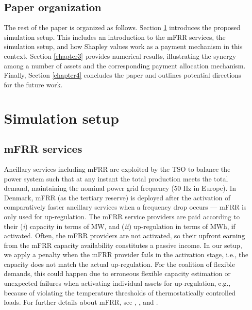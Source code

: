 \documentclass[conference]{IEEEtran}
\begin{document}
\vspace{0mm}
\subsection{Paper organization}
\vspace{-1mm}
The rest of the paper is organized as follows.
Section \ref{chapter2} introduces the proposed simulation setup. This includes an introduction to the mFRR services, the simulation setup, and how Shapley values work as a payment mechanism in this context. Section \ref{chapter3} provides numerical results, illustrating the synergy among a number of assets and the corresponding payment allocation mechanism. Finally, Section \ref{chapter4} concludes the paper and outlines  potential directions for the future work.

\section{Simulation setup}
\label{chapter2}

\subsection{mFRR services}\label{sec:mFRR}
%
Ancillary services including mFRR are exploited by the TSO to balance the power system such that at any instant the total production meets the total demand, maintaining the nominal power grid frequency (50 Hz in Europe). In Denmark, mFRR (as the tertiary reserve) is deployed after the activation of comparatively faster ancillary services when a frequency drop occurs --- mFRR is only used for up-regulation. The mFRR service providers are paid according to their (\textit{i}) capacity in terms of MW, and (\textit{ii}) up-regulation in terms of MWh, if activated. Often, the mFRR providers are not activated, so their upfront earning from the mFRR capacity availability constitutes a passive income. In our setup, we apply a penalty when the mFRR provider fails in the activation stage, i.e., the capacity does not match the actual up-regulation. For the coalition of flexible demands, this could happen  due to erroneous  flexible capacity estimation or unexpected failures when activating individual assets for up-regulation, e.g.,  because of violating the temperature thresholds of thermostatically controlled loads. %
For further details about mFRR, see  \cite{energinet:prequalification}, \cite{energinet:Systemydelser}, and \cite{energinet:tender_conditions_reserves}.
\end{document}
